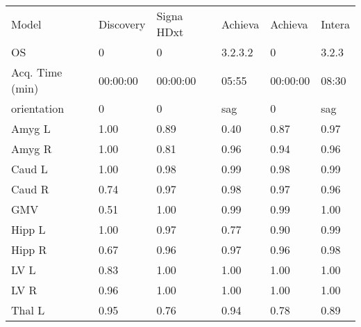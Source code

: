 \begin{table}
\begin{tabular}{llllll}
Model                 &              Discovery &         Signa HDxt &                            Achieva &            Achieva &                      Intera \\
OS                    &                      0 &                  0 &                            3.2.3.2 &                  0 &                       3.2.3 \\
Acq. Time (min)       &               00:00:00 &           00:00:00 &                           05:55 &           00:00:00 &                    08:30 \\
orientation           &                      0 &                  0 &                                sag &                  0 &                         sag \\
\midrule
Amyg L                &                   1.00 &               0.89 &                               0.40 &               0.87 &                        0.97 \\
Amyg R                &                   1.00 &               0.81 &                               0.96 &               0.94 &                        0.96 \\
Caud L                &                   1.00 &               0.98 &                               0.99 &               0.98 &                        0.99 \\
Caud R                &                   0.74 &               0.97 &                               0.98 &               0.97 &                        0.96 \\
GMV                   &                   0.51 &               1.00 &                               0.99 &               0.99 &                        1.00 \\
Hipp L                &                   1.00 &               0.97 &                               0.77 &               0.90 &                        0.99 \\
Hipp R                &                   0.67 &               0.96 &                               0.97 &               0.96 &                        0.98 \\
LV L                  &                   0.83 &               1.00 &                               1.00 &               1.00 &                        1.00 \\
LV R                  &                   0.96 &               1.00 &                               1.00 &               1.00 &                        1.00 \\
Thal L                &                   0.95 &               0.76 &                               0.94 &               0.78 &                        0.89 \\

\end{tabular}
\end{table}
